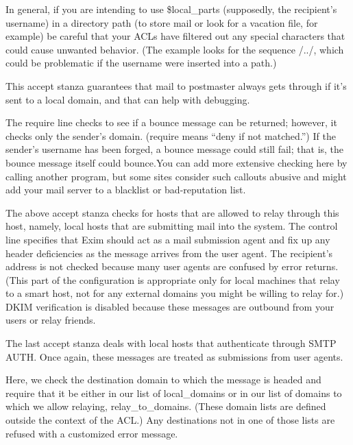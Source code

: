 In general, if you are intending to use {\$local\_parts} (supposedly,
the recipient's username) in a directory path (to store mail or look for
a vacation file, for example) be careful that your ACLs have filtered
out any special characters that could cause unwanted behavior. (The
example looks for the sequence /../, which could be problematic if the
username were inserted into a path.)


This {accept} stanza guarantees that mail to postmaster always gets
through if it's sent to a local domain, and that can help with
debugging.


The {require} line checks to see if a bounce message can be returned;
however, it checks only the sender's domain. ({require} means ``{deny}
if not matched.'') If the sender's username has been forged, a bounce
message could still fail; that is, the bounce message itself could
bounce.You can add more extensive checking here by calling another
program, but some
\protect\hypertarget{part0026_split_047.htmlux5cux23_idIndexMarker2651}{}{}sites
consider such callouts abusive and might add your mail server to a
blacklist or bad-reputation list.


The above {accept} stanza checks for hosts that are allowed to relay
through this host, namely, local hosts that are submitting mail into the
system. The {control} line specifies that Exim should act as a mail
submission agent and fix up any header deficiencies as the message
arrives from the user agent. The recipient's address is not checked
because many user agents are confused by error returns. (This part of
the configuration is appropriate only for local machines that relay to a
smart host, not for any external domains you might be willing to relay
for.) DKIM verification is disabled because these messages are outbound
from your users or relay friends.


The last {accept} stanza deals with local hosts that authenticate
through SMTP AUTH. Once again, these messages are treated as submissions
from user agents.


Here, we check the destination domain to which the message is headed and
require that it be either in our list of {local\_domains} or in our list
of domains to which we allow relaying, {relay\_to\_domains}. (These
domain lists are defined outside the context of the ACL.) Any
destinations not in one of those lists are refused with a customized
error message.

